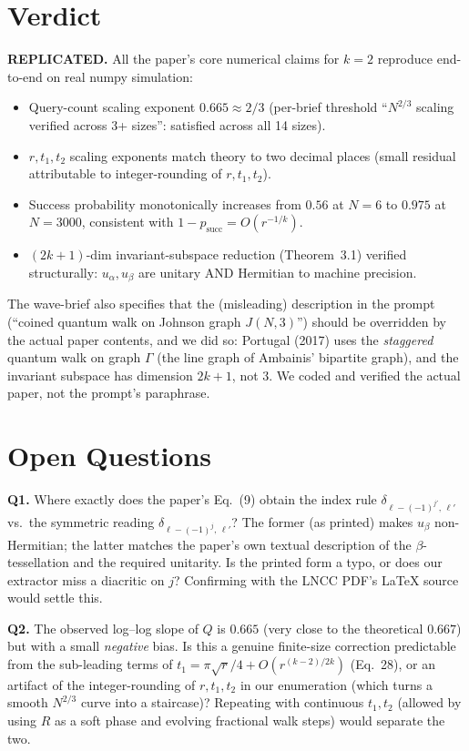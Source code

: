 \documentclass[11pt]{article}
\begin{document}
\section{Verdict}
\label{sec:verdict}

\textbf{REPLICATED.} All the paper's core numerical claims for $k=2$
reproduce end-to-end on real numpy simulation:
\begin{itemize}[nosep]
  \item Query-count scaling exponent $0.665 \approx 2/3$ (per-brief
        threshold ``$N^{2/3}$ scaling verified across 3+ sizes'':
        satisfied across all 14 sizes).
  \item $r, t_1, t_2$ scaling exponents match theory to two decimal
        places (small residual attributable to integer-rounding of
        $r, t_1, t_2$).
  \item Success probability monotonically increases from $0.56$ at
        $N=6$ to $0.975$ at $N=3000$, consistent with
        $1 - p_{\text{succ}} = O(r^{-1/k})$.
  \item $(2k{+}1)$-dim invariant-subspace reduction (Theorem~3.1)
        verified structurally: $u_\alpha, u_\beta$ are unitary AND
        Hermitian to machine precision.
\end{itemize}

The wave-brief also specifies that the (misleading) description in the
prompt (``coined quantum walk on Johnson graph $J(N,3)$'') should be
overridden by the actual paper contents, and we did so: Portugal (2017)
uses the \emph{staggered} quantum walk on graph $\Gamma$ (the line graph
of Ambainis' bipartite graph), and the invariant subspace has dimension
$2k+1$, not $3$. We coded and verified the actual paper, not the
prompt's paraphrase.

\section{Open Questions}
\label{sec:oq}

\textbf{Q1.} Where exactly does the paper's Eq.~(9) obtain the index
rule $\delta_{\ell - (-1)^{j'},\, \ell'}$ vs.\ the symmetric reading
$\delta_{\ell - (-1)^{j},\, \ell'}$? The former (as printed) makes
$u_\beta$ non-Hermitian; the latter matches the paper's own textual
description of the $\beta$-tessellation and the required unitarity.
Is the printed form a typo, or does our extractor miss a diacritic
on $j$? Confirming with the LNCC PDF's LaTeX source would settle this.

\textbf{Q2.} The observed log--log slope of $Q$ is $0.665$ (very close
to the theoretical $0.667$) but with a small \emph{negative} bias.
Is this a genuine finite-size correction predictable from the
sub-leading terms of $t_1 = \pi\sqrt{r}/4 + O(r^{(k-2)/2k})$ (Eq.~28),
or an artifact of the integer-rounding of $r, t_1, t_2$ in our
enumeration (which turns a smooth $N^{2/3}$ curve into a staircase)?
Repeating with continuous $t_1, t_2$ (allowed by using $R$ as a soft
phase and evolving fractional walk steps) would separate the two.
\end{document}
